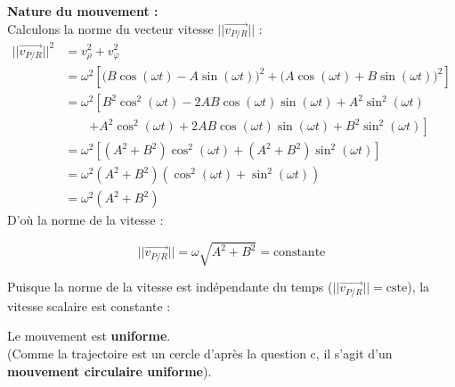 \documentclass[11pt,a4paper]{article}
\begin{document}
\textbf{Nature du mouvement :} \\
Calculons la norme du vecteur vitesse $||\vec{v_{P/R}}||$ :
\begin{align*}
||\vec{v_{P/R}}||^2 &= v_\rho^2 + v_\varphi^2 \\
&= \omega^2 \left[ \bigl(B\cos(\omega t) - A\sin(\omega t)\bigr)^2 + \bigl(A\cos(\omega t) + B\sin(\omega t)\bigr)^2 \right] \\
&= \omega^2 \left[ B^2\cos^2(\omega t) - 2AB\cos(\omega t)\sin(\omega t) + A^2\sin^2(\omega t) \right. \\
&\quad\quad \left. + A^2\cos^2(\omega t) + 2AB\cos(\omega t)\sin(\omega t) + B^2\sin^2(\omega t) \right] \\
&= \omega^2 \left[ (A^2 + B^2)\cos^2(\omega t) + (A^2 + B^2)\sin^2(\omega t) \right] \\
&= \omega^2 (A^2 + B^2) (\cos^2(\omega t) + \sin^2(\omega t)) \\
&= \omega^2 (A^2 + B^2)
\end{align*}
D'où la norme de la vitesse :
\begin{sonucbox}
$$ ||\vec{v_{P/R}}|| = \omega \sqrt{A^2 + B^2} = \text{constante} $$
\end{sonucbox}
Puisque la norme de la vitesse est indépendante du temps ($||\vec{v_{P/R}}|| = \text{cste}$), la vitesse scalaire est constante :
\begin{sonucbox}
Le mouvement est \textbf{uniforme}. \\
(Comme la trajectoire est un cercle d'après la question c, il s'agit d'un \textbf{mouvement circulaire uniforme}).
\end{sonucbox}
\end{document}
